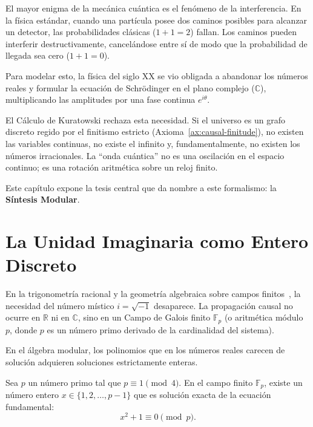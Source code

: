\documentclass[11pt, a4paper, openany]{book}
\begin{document}
El mayor enigma de la mec\'anica cu\'antica es el fen\'omeno de la
interferencia. En la f\'isica est\'andar, cuando una part\'icula posee
dos caminos posibles para alcanzar un detector, las probabilidades
cl\'asicas ($1 + 1 = 2$) fallan. Los caminos pueden interferir
destructivamente, cancel\'andose entre s\'i de modo que la probabilidad
de llegada sea cero ($1 + 1 = 0$).

Para modelar esto, la f\'isica del siglo XX se vio obligada a abandonar
los n\'umeros reales y formular la ecuaci\'on de Schr\"odinger en el
plano complejo ($\mathbb{C}$), multiplicando las amplitudes por una fase
continua $e^{i\theta}$.

El C\'alculo de Kuratowski rechaza esta necesidad. Si el universo es un
grafo discreto regido por el finitismo estricto
(Axioma~\ref{ax:causal-finitude}), no existen las variables continuas,
no existe el infinito y, fundamentalmente, no existen los n\'umeros
irracionales. La ``onda cu\'antica'' no es una oscilaci\'on en el
espacio continuo; es una rotaci\'on aritm\'etica sobre un reloj finito.

Este cap\'itulo expone la tesis central que da nombre a este formalismo:
la \textbf{S\'intesis Modular}.

\section{La Unidad Imaginaria como Entero Discreto}
\label{sec:modulo-imaginario}

En la trigonometr\'ia racional y la geometr\'ia algebraica sobre campos
finitos~\cite{wildberger2005}, la necesidad del n\'umero m\'istico
$i = \sqrt{-1}$ desaparece. La propagaci\'on causal no ocurre en
$\mathbb{R}$ ni en $\mathbb{C}$, sino en un Campo de Galois finito
$\mathbb{F}_p$ (o aritm\'etica m\'odulo~$p$, donde $p$ es un n\'umero
primo derivado de la cardinalidad del sistema).

En el \'algebra modular, los polinomios que en los n\'umeros reales
carecen de soluci\'on adquieren soluciones estrictamente enteras.

\begin{theorem}
\label{thm:discrete-i}
Sea $p$ un n\'umero primo tal que $p \equiv 1 \pmod 4$. En el campo
finito $\mathbb{F}_p$, existe un n\'umero entero
$x \in \{1, 2, \ldots, p-1\}$ que es soluci\'on exacta de la
ecuaci\'on fundamental:
\begin{equation}
  x^2 + 1 \equiv 0 \pmod p.
  \label{eq:discrete-i}
\end{equation}
\end{theorem}
\end{document}
